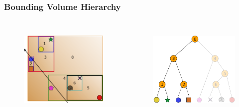 \documentclass{beamer}
\begin{document}
\begin{frame}
  \frametitle{Bounding Volume Hierarchy}
  
\begin{columns}[t]

\begin{figure}
\includegraphics[height=45mm]{primitive-box-ray.png}
\end{figure}

\begin{figure}
\includegraphics[height=45mm]{elim_0.png}
\end{figure}
\end{columns}
\end{frame}
\end{document}
